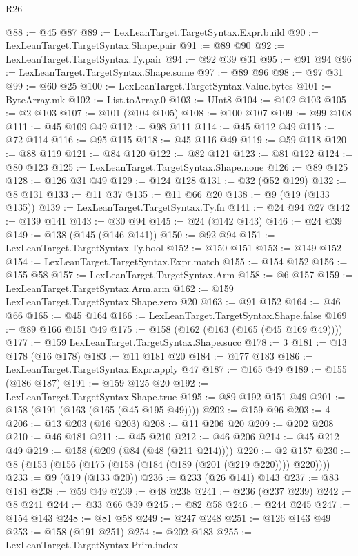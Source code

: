 \begin{lexlean}{R26}
\begin{coremodule}
@88 := @45 @87
@89 := LexLeanTarget.TargetSyntax.Expr.build
@90 := LexLeanTarget.TargetSyntax.Shape.pair
@91 := @89 @90
@92 := LexLeanTarget.TargetSyntax.Ty.pair
@94 := @92 @39 @31
@95 := @91 @94
@96 := LexLeanTarget.TargetSyntax.Shape.some
@97 := @89 @96
@98 := @97 @31
@99 := @60 @25
@100 := LexLeanTarget.TargetSyntax.Value.bytes
@101 := ByteArray.mk
@102 := List.toArray.{0}
@103 := UInt8
@104 := @102 @103
@105 := @2 @103
@107 := @101 (@104 @105)
@108 := @100 @107
@109 := @99 @108
@111 := @45 @109 @49
@112 := @98 @111
@114 := @45 @112 @49
@115 := @72 @114
@116 := @95 @115
@118 := @45 @116 @49
@119 := @59 @118
@120 := @88 @119
@121 := @84 @120
@122 := @82 @121
@123 := @81 @122
@124 := @80 @123
@125 := LexLeanTarget.TargetSyntax.Shape.none
@126 := @89 @125
@128 := @126 @31 @49
@129 := @124 @128
@131 := @32 (@52 @129)
@132 := @8 @131
@133 := @11 @37
@135 := @11 @66 @20
@138 := @9 (@19 (@133 @135))
@139 := LexLeanTarget.TargetSyntax.Ty.fn
@141 := @24 @94 @27
@142 := @139 @141
@143 := @30 @94
@145 := @24 (@142 @143)
@146 := @24 @39
@149 := @138 (@145 (@146 @141))
@150 := @92 @94
@151 := LexLeanTarget.TargetSyntax.Ty.bool
@152 := @150 @151
@153 := @149 @152
@154 := LexLeanTarget.TargetSyntax.Expr.match
@155 := @154 @152
@156 := @155 @58
@157 := LexLeanTarget.TargetSyntax.Arm
@158 := @6 @157
@159 := LexLeanTarget.TargetSyntax.Arm.arm
@162 := @159 LexLeanTarget.TargetSyntax.Shape.zero @20
@163 := @91 @152
@164 := @46 @66
@165 := @45 @164
@166 := LexLeanTarget.TargetSyntax.Shape.false
@169 := @89 @166 @151 @49
@175 := @158 (@162 (@163 (@165 (@45 @169 @49))))
@177 := @159 LexLeanTarget.TargetSyntax.Shape.succ
@178 := 3
@181 := @13 @178 (@16 @178)
@183 := @11 @181 @20
@184 := @177 @183
@186 := LexLeanTarget.TargetSyntax.Expr.apply @47
@187 := @165 @49
@189 := @155 (@186 @187)
@191 := @159 @125 @20
@192 := LexLeanTarget.TargetSyntax.Shape.true
@195 := @89 @192 @151 @49
@201 := @158 (@191 (@163 (@165 (@45 @195 @49))))
@202 := @159 @96
@203 := 4
@206 := @13 @203 (@16 @203)
@208 := @11 @206 @20
@209 := @202 @208
@210 := @46 @181
@211 := @45 @210
@212 := @46 @206
@214 := @45 @212 @49
@219 := @158 (@209 (@84 (@48 (@211 @214))))
@220 := @2 @157
@230 := @8 (@153 (@156 (@175 (@158 (@184 (@189 (@201 (@219 @220)))) @220))))
@233 := @9 (@19 (@133 @20))
@236 := @233 (@26 @141) @143
@237 := @83 @181
@238 := @59 @49
@239 := @48 @238
@241 := @236 (@237 @239)
@242 := @8 @241
@244 := @33 @66 @39
@245 := @82 @58
@246 := @244 @245
@247 := @154 @143
@248 := @81 @58
@249 := @247 @248
@251 := @126 @143 @49
@253 := @158 (@191 @251)
@254 := @202 @183
@255 := LexLeanTarget.TargetSyntax.Prim.index

\end{coremodule}
\end{lexlean}
